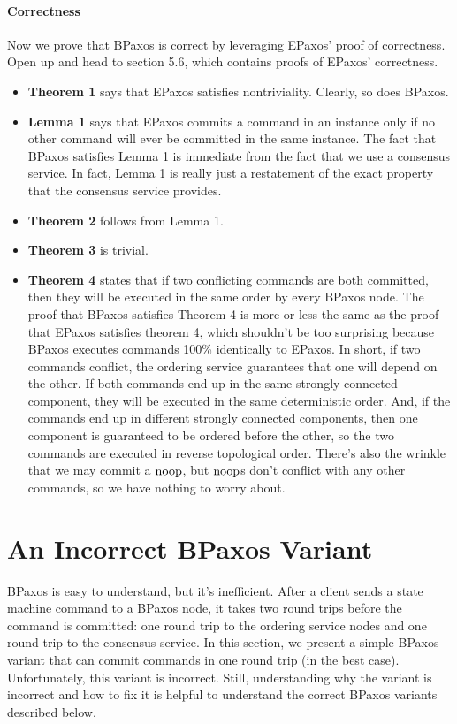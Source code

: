 \documentclass{mwhittaker}
\theoremstyle{definition}
\begin{document}
\paragraph{Correctness}
Now we prove that BPaxos is correct by leveraging EPaxos' proof of correctness.
Open up \cite{moraru2013proof} and head to section 5.6, which contains proofs
of EPaxos' correctness.
\begin{itemize}
  \item
    \textbf{Theorem 1} says that EPaxos satisfies nontriviality. Clearly, so
    does BPaxos.

  \item
    \textbf{Lemma 1} says that EPaxos commits a command in an instance only if
    no other command will ever be committed in the same instance. The fact that
    BPaxos satisfies Lemma 1 is immediate from the fact that we use a consensus
    service. In fact, Lemma 1 is really just a restatement of the exact
    property that the consensus service provides.

  \item
    \textbf{Theorem 2} follows from Lemma 1.

  \item
    \textbf{Theorem 3} is trivial.

  \item
    \textbf{Theorem 4} states that if two conflicting commands are both
    committed, then they will be executed in the same order by every BPaxos
    node. The proof that BPaxos satisfies Theorem 4 is more or less the same as
    the proof that EPaxos satisfies theorem 4, which shouldn't be too
    surprising because BPaxos executes commands 100\% identically to EPaxos. In
    short, if two commands conflict, the ordering service guarantees that one
    will depend on the other. If both commands end up in the same strongly
    connected component, they will be executed in the same deterministic order.
    And, if the commands end up in different strongly connected components,
    then one component is guaranteed to be ordered before the other, so the two
    commands are executed in reverse topological order. There's also the
    wrinkle that we may commit a $\text{noop}$, but $\text{noop}$s don't conflict with any
    other commands, so we have nothing to worry about.
\end{itemize}

\section{An Incorrect BPaxos Variant}
BPaxos is easy to understand, but it's inefficient. After a client sends a
state machine command to a BPaxos node, it takes two round trips before the
command is committed: one round trip to the ordering service nodes and one
round trip to the consensus service. In this section, we present a simple
BPaxos variant that can commit commands in one round trip (in the best case).
Unfortunately, this variant is incorrect. Still, understanding why the variant
is incorrect and how to fix it is helpful to understand the correct BPaxos
variants described below.
\end{document}
